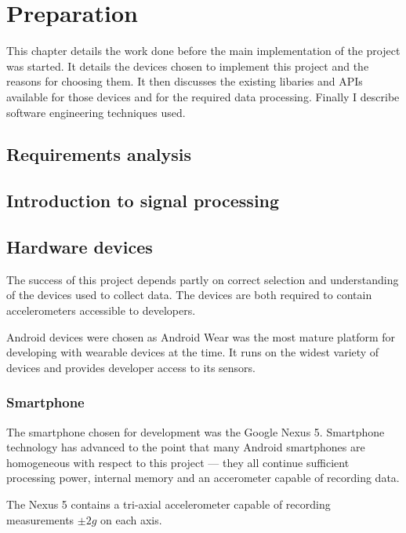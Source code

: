 \chapter{Preparation}
  This chapter details the work done before the main implementation of the project was started. It
  details the devices chosen to implement this project and the reasons for choosing them. It then
  discusses the existing libaries and APIs available for those devices and for the required data
  processing. Finally I describe software engineering techniques used.

  \section{Requirements analysis}
  
  \section{Introduction to signal processing}
  
  
  \section{Hardware devices}
    The success of this project depends partly on correct selection and understanding of the devices
    used to collect data. The devices are both required to contain accelerometers accessible to
    developers.
    
    Android devices were chosen as Android Wear was the most mature platform for developing with
    wearable devices at the time. It runs on the widest variety of devices and provides developer 
    access to its sensors.
    
    \subsection{Smartphone}
      The smartphone chosen for development was the Google Nexus 5. Smartphone technology has
      advanced to the point that many Android smartphones are homogeneous with respect to this
      project --- they all continue sufficient processing power, internal memory and an 
      accerometer capable of recording data.
      
      The Nexus 5 contains a tri-axial accelerometer capable of recording measurements $\pm2\si{g}$
      on each axis.
      
    
